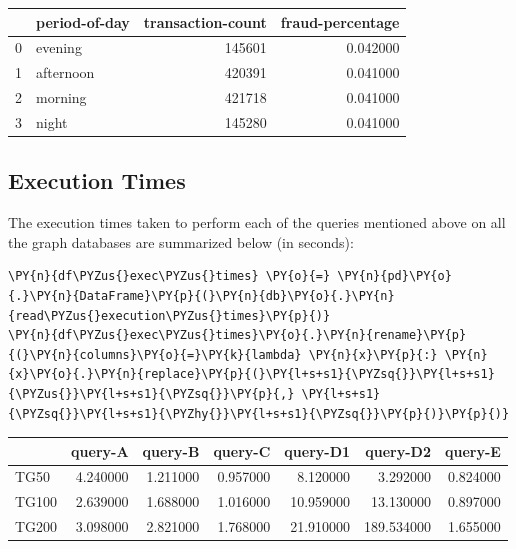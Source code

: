             
    
    \begin{center}
\begin{tabular}{llrr}
\toprule
 & period-of-day & transaction-count & fraud-percentage \\
\midrule
0 & evening & 145601 & 0.042000 \\
1 & afternoon & 420391 & 0.041000 \\
2 & morning & 421718 & 0.041000 \\
3 & night & 145280 & 0.041000 \\
\bottomrule
\end{tabular}

\end{center}

    

    \hypertarget{execution-times}{%
\subsection{Execution Times}\label{execution-times}}

    The execution times taken to perform each of the queries mentioned above
on all the graph databases are summarized below (in seconds):

    \begin{tcolorbox}[breakable, size=fbox, boxrule=1pt, pad at break*=1mm,colback=cellbackground, colframe=cellborder]
\begin{Verbatim}[commandchars=\\\{\}]
\PY{n}{df\PYZus{}exec\PYZus{}times} \PY{o}{=} \PY{n}{pd}\PY{o}{.}\PY{n}{DataFrame}\PY{p}{(}\PY{n}{db}\PY{o}{.}\PY{n}{read\PYZus{}execution\PYZus{}times}\PY{p}{)}
\PY{n}{df\PYZus{}exec\PYZus{}times}\PY{o}{.}\PY{n}{rename}\PY{p}{(}\PY{n}{columns}\PY{o}{=}\PY{k}{lambda} \PY{n}{x}\PY{p}{:} \PY{n}{x}\PY{o}{.}\PY{n}{replace}\PY{p}{(}\PY{l+s+s1}{\PYZsq{}}\PY{l+s+s1}{\PYZus{}}\PY{l+s+s1}{\PYZsq{}}\PY{p}{,} \PY{l+s+s1}{\PYZsq{}}\PY{l+s+s1}{\PYZhy{}}\PY{l+s+s1}{\PYZsq{}}\PY{p}{)}\PY{p}{)}
\end{Verbatim}
\end{tcolorbox}
 
            
    
    \begin{center}
\begin{tabular}{lrrrrrr}
\toprule
 & query-A & query-B & query-C & query-D1 & query-D2 & query-E \\
\midrule
TG50 & 4.240000 & 1.211000 & 0.957000 & 8.120000 & 3.292000 & 0.824000 \\
TG100 & 2.639000 & 1.688000 & 1.016000 & 10.959000 & 13.130000 & 0.897000 \\
TG200 & 3.098000 & 2.821000 & 1.768000 & 21.910000 & 189.534000 & 1.655000 \\
\bottomrule
\end{tabular}

\end{center}

